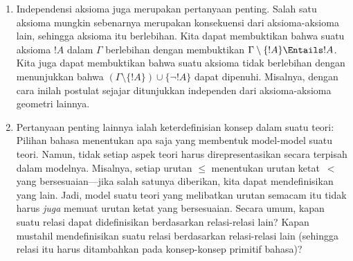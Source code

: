 \documentclass[../../../include/open-logic-section]{subfiles}
\begin{document}
\begin{explain}
\begin{enumerate}
  kita kodifikasikan dalam suatu sistem aksioma. Salah satu hal yang ingin kita
  verifikasi segera ialah bahwa aksioma-aksioma itu tidak saling bertentangan:
  jika saling bertentangan, tidak mungkin ada konsep yang mematuhi hukum-hukum
  tersebut, dan kita telah mencoba membangun teori yang tidak koheren. Kita
  dapat memverifikasi bahwa hal ini tidak terjadi dengan menemukan suatu model
  dari~$\Gamma$. Dan jika teori kita mempunyai model, kita dapat menggunakan
  metode logis untuk menyelidikinya, serta untuk membangun model.
\item Independensi aksioma juga merupakan pertanyaan penting. Salah satu
  aksioma mungkin sebenarnya merupakan konsekuensi dari aksioma-aksioma lain,
  sehingga aksioma itu berlebihan. Kita dapat membuktikan bahwa suatu aksioma
  $!A$ dalam $\Gamma$ berlebihan dengan membuktikan $\Gamma \setminus
  \{!A\} \Entails !A$. Kita juga dapat membuktikan bahwa suatu aksioma tidak
  berlebihan dengan menunjukkan bahwa $(\Gamma \setminus \{!A\}) \cup
  \{\lnot !A\}$ dapat dipenuhi. Misalnya, dengan cara inilah postulat sejajar
  ditunjukkan independen dari aksioma-aksioma geometri lainnya.
\item Pertanyaan penting lainnya ialah keterdefinisian konsep dalam suatu
  teori: Pilihan bahasa menentukan apa saja yang membentuk model-model suatu
  teori. Namun, tidak setiap aspek teori harus direpresentasikan secara
  terpisah dalam modelnya. Misalnya, setiap urutan $\le$ menentukan urutan
  ketat~$<$ yang bersesuaian---jika salah satunya diberikan, kita dapat
  mendefinisikan yang lain. Jadi, model suatu teori yang melibatkan urutan
  semacam itu tidak harus \emph{juga} memuat urutan ketat yang bersesuaian.
  Secara umum, kapan suatu relasi dapat didefinisikan berdasarkan relasi-relasi
  lain? Kapan mustahil mendefinisikan suatu relasi berdasarkan relasi-relasi
  lain (sehingga relasi itu harus ditambahkan pada konsep-konsep primitif
  bahasa)?
\end{enumerate}
\end{explain}
\end{document}
